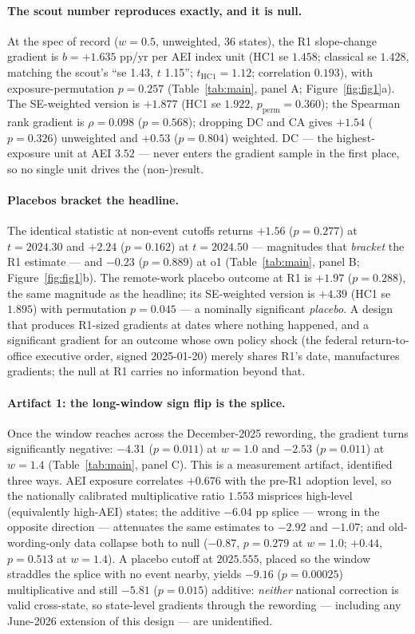 \documentclass[11pt]{article}
\begin{document}
\paragraph{The scout number reproduces exactly, and it is null.} At the spec
of record ($w=0.5$, unweighted, 36 states), the R1 slope-change gradient is
$b=+1.635$ pp/yr per AEI index unit (HC1 se $1.458$; classical se $1.428$,
matching the scout's ``se 1.43, $t$ 1.15''; $t_{\mathrm{HC1}}=1.12$;
correlation $0.193$), with exposure-permutation $p=0.257$
(Table~\ref{tab:main}, panel A; Figure~\ref{fig:fig1}a). The SE-weighted
version is $+1.877$ (HC1 se $1.922$, $p_{\mathrm{perm}}=0.360$); the
Spearman rank gradient is $\rho=0.098$ ($p=0.568$); dropping DC and CA gives
$+1.54$ ($p=0.326$) unweighted and $+0.53$ ($p=0.804$) weighted. DC --- the
highest-exposure unit at AEI $3.52$ --- never enters the gradient sample in
the first place, so no single unit drives the (non-)result.

\paragraph{Placebos bracket the headline.} The identical statistic at
non-event cutoffs returns $+1.56$ ($p=0.277$) at $t=2024.30$ and $+2.24$
($p=0.162$) at $t=2024.50$ --- magnitudes that \emph{bracket} the R1
estimate --- and $-0.23$ ($p=0.889$) at o1 (Table~\ref{tab:main}, panel B;
Figure~\ref{fig:fig1}b). The remote-work placebo outcome at R1 is $+1.97$
($p=0.288$), the same magnitude as the headline; its SE-weighted version is
$+4.39$ (HC1 se $1.895$) with permutation $p=0.045$ --- a nominally
significant \emph{placebo}. A design that produces R1-sized gradients at
dates where nothing happened, and a significant gradient for an outcome
whose own policy shock (the federal return-to-office executive order, signed
2025-01-20) merely shares R1's date, manufactures gradients; the null at R1
carries no information beyond that.

\paragraph{Artifact 1: the long-window sign flip is the splice.} Once the
window reaches across the December-2025 rewording, the gradient turns
significantly negative: $-4.31$ ($p=0.011$) at $w=1.0$ and $-2.53$
($p=0.011$) at $w=1.4$ (Table~\ref{tab:main}, panel C). This is a
measurement artifact, identified three ways. AEI exposure correlates
$+0.676$ with the pre-R1 adoption level, so the nationally calibrated
multiplicative ratio $1.553$ misprices high-level (equivalently high-AEI)
states; the additive $-6.04$ pp splice --- wrong in the opposite direction
--- attenuates the same estimates to $-2.92$ and $-1.07$; and
old-wording-only data collapse both to null ($-0.87$, $p=0.279$ at $w=1.0$;
$+0.44$, $p=0.513$ at $w=1.4$). A placebo cutoff at $2025.555$, placed so
the window straddles the splice with no event nearby, yields $-9.16$
($p=0.00025$) multiplicative and still $-5.81$ ($p=0.015$) additive:
\emph{neither} national correction is valid cross-state, so state-level
gradients through the rewording --- including any June-2026 extension of
this design --- are unidentified.
\end{document}
